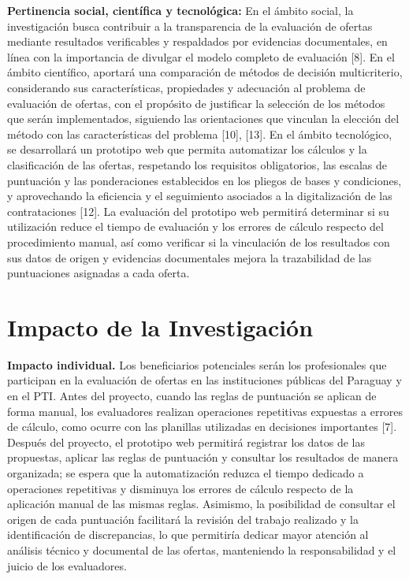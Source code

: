 \documentclass[12pt,a4paper]{article}
\begin{document}
\textbf{Pertinencia social, científica y tecnológica:} En el ámbito social, la investigación busca contribuir a la transparencia de la evaluación de ofertas mediante resultados verificables y respaldados por evidencias documentales, en línea con la importancia de divulgar el modelo completo de evaluación [8]. En el ámbito científico, aportará una comparación de métodos de decisión multicriterio, considerando sus características, propiedades y adecuación al problema de evaluación de ofertas, con el propósito de justificar la selección de los métodos que serán implementados, siguiendo las orientaciones que vinculan la elección del método con las características del problema [10], [13]. En el ámbito tecnológico, se desarrollará un prototipo web que permita automatizar los cálculos y la clasificación de las ofertas, respetando los requisitos obligatorios, las escalas de puntuación y las ponderaciones establecidos en los pliegos de bases y condiciones, y aprovechando la eficiencia y el seguimiento asociados a la digitalización de las contrataciones [12]. La evaluación del prototipo web permitirá determinar si su utilización reduce el tiempo de evaluación y los errores de cálculo respecto del procedimiento manual, así como verificar si la vinculación de los resultados con sus datos de origen y evidencias documentales mejora la trazabilidad de las puntuaciones asignadas a cada oferta.

\section{Impacto de la Investigación}

\textbf{Impacto individual.} Los beneficiarios potenciales serán los profesionales que participan en la evaluación de ofertas en las instituciones públicas del Paraguay y en el PTI. Antes del proyecto, cuando las reglas de puntuación se aplican de forma manual, los evaluadores realizan operaciones repetitivas expuestas a errores de cálculo, como ocurre con las planillas utilizadas en decisiones importantes [7]. Después del proyecto, el prototipo web permitirá registrar los datos de las propuestas, aplicar las reglas de puntuación y consultar los resultados de manera organizada; se espera que la automatización reduzca el tiempo dedicado a operaciones repetitivas y disminuya los errores de cálculo respecto de la aplicación manual de las mismas reglas. Asimismo, la posibilidad de consultar el origen de cada puntuación facilitará la revisión del trabajo realizado y la identificación de discrepancias, lo que permitiría dedicar mayor atención al análisis técnico y documental de las ofertas, manteniendo la responsabilidad y el juicio de los evaluadores.
\end{document}
